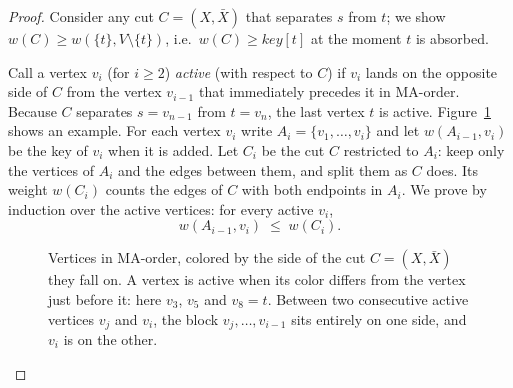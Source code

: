 \begin{proof}
Consider any cut $C=(X,\bar X)$ that separates $s$ from $t$; we show $w(C)\ge w(\{t\},V\setminus\{t\})$, i.e.\ $w(C)\ge \textit{key}[t]$ at the moment $t$ is absorbed.

Call a vertex $v_i$ (for $i\ge 2$) \emph{active} (with respect to $C$) if $v_i$ lands on the opposite side of $C$ from the vertex $v_{i-1}$ that immediately precedes it in MA-order. Because $C$ separates $s=v_{n-1}$ from $t=v_n$, the last vertex $t$ is active. Figure~\ref{ch11:fig-active} shows an example. For each vertex $v_i$ write $A_i = \{v_1,\dots,v_i\}$ and let $w(A_{i-1}, v_i)$ be the key of $v_i$ when it is added. Let $C_i$ be the cut $C$ restricted to $A_i$: keep only the vertices of $A_i$ and the edges between them, and split them as $C$ does. Its weight $w(C_i)$ counts the edges of $C$ with both endpoints in $A_i$. We prove by induction over the active vertices: for every active $v_i$,
\[
  w(A_{i-1}, v_i) \;\le\; w(C_i).
\tag{$\star$}\label{ch11:star}
\]

\begin{figure}[htbp]
\centering
{}
\caption{Vertices in MA-order, colored by the side of the cut $C=(X,\bar X)$ they fall on. A vertex is active when its color differs from the vertex just before it: here $v_3$, $v_5$ and $v_8=t$. Between two consecutive active vertices $v_j$ and $v_i$, the block $v_j,\dots,v_{i-1}$ sits entirely on one side, and $v_i$ is on the other.}
\label{ch11:fig-active}
\end{figure}


\end{proof}
